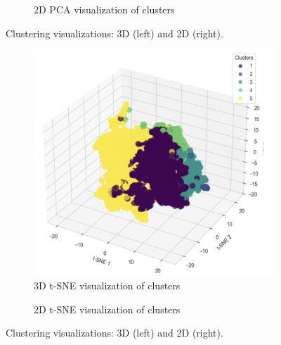 \begin{figure}[H]
\begin{subfigure}[b]{0.45\textwidth}
        \caption{2D PCA visualization of clusters}
        \label{fig:PCA_2d}
    \end{subfigure}
    \caption{Clustering visualizations: 3D (left) and 2D (right).}
    \label{fig:comparison1}
\end{figure}

\begin{figure}[H]
    \centering
    \begin{subfigure}[b]{0.45\textwidth}
        \centering
        \includegraphics[width=\textwidth]{src/figs/3d_t-SNE.png}
        \caption{3D t-SNE visualization of clusters}
        \label{fig:3D_tsne}
    \end{subfigure}
    \hfill
    \begin{subfigure}[b]{0.45\textwidth}
        \centering
        \caption{2D t-SNE visualization of clusters}
        \label{fig:2D_tsne}
    \end{subfigure}
    \caption{Clustering visualizations: 3D (left) and 2D (right).}
    \label{fig:comparison2}
\end{figure}

